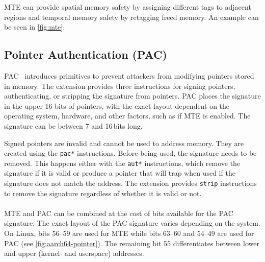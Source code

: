 \Ac{MTE} can provide spatial memory safety by assigning different tags to adjacent regions and temporal memory safety by retagging freed memory.
An example can be seen in \cref{fig:mte}.

\subsection{Pointer Authentication (PAC)}
\label{subsec:pac}

\Ac{PAC}~\cite{Qualcomm2017PointerAuth} introduces primitives to prevent attackers from modifying pointers stored in memory.
The extension provides three instructions for signing pointers, authenticating, or stripping the signature from pointers.
\ac{PAC} places the signature in the upper 16 bits of pointers, with the exact layout dependent on the operating system, hardware, and other factors, such as if \ac{MTE} is enabled.
The signature can be between 7 and 16\,bits long.

Signed pointers are invalid and cannot be used to address memory.
They are created using the \texttt{pac*} instructions.
Before being used, the signature needs to be removed.
This happens either with the \texttt{aut*} instructions, which remove the signature if it is valid or produce a pointer that will trap when used if the signature does not match the address.
The extension provides \texttt{strip} instructions to remove the signature regardless of whether it is valid or not.

\paragraph{} \ac{MTE} and \ac{PAC} can be combined at the cost of bits available for the \ac{PAC} signature.
The exact layout of the \ac{PAC} signature varies depending on the system.
On Linux, bits 56--59 are used for \ac{MTE} while bits 63--60 and 54--49 are used for \ac{PAC} (see \cref{fig:aarch64-pointer}).
The remaining bit 55 differentiates between lower and upper (kernel- and userspace) addresses.
